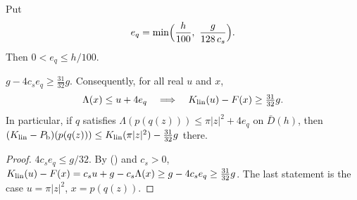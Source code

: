 \begin{definition}\label{def:fcp-eq}
Put
\[
 e_q=\min\Bigl(\frac h{100},\ \frac g{128\,c_s}\Bigr).
\]
Then $0<e_q\le h/100$.
\end{definition}

\begin{lemma}[Margin]\label{lem:fcp-margin}
$g-4c_se_q\ge\frac{31}{32}g$. Consequently, for all real $u$ and $x$,
\[
 \Lambda(x)\le u+4e_q\quad\Longrightarrow\quad K_{\rm lin}(u)-F(x)\ge\tfrac{31}{32}g .
\]
In particular, if $q$ satisfies $\Lambda(p(q(z)))\le\pi|z|^2+4e_q$ on $\bar D(h)$, then
$(K_{\rm lin}-P_{\mathrm b})(p(q(z)))\le K_{\rm lin}(\pi|z|^2)-\frac{31}{32}g$ there.
\end{lemma}

\begin{proof}
$4c_se_q\le g/32$. By () and $c_s>0$, $K_{\rm lin}(u)-F(x)=c_su+g-c_s\Lambda(x)\ge g-4c_se_q\ge\tfrac{31}{32}g$. The last statement is the case $u=\pi|z|^2$, $x=p(q(z))$.
\end{proof}
